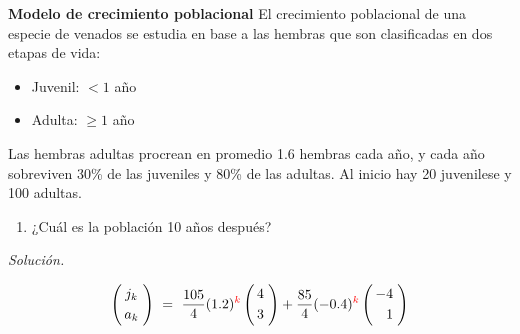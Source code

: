 \begin{frame} 
	
	\begin{ejer}{\textbf{Modelo de crecimiento poblacional}} \justifying
		El crecimiento poblacional de una especie de venados se estudia en base a las hembras que son clasificadas en dos etapas de vida:
		
		\vspace{-2mm}
		\begin{multicols}{2}
			\begin{itemize}
				\item Juvenil: $<1$ año
				\item Adulta: $\ge 1$ año
			\end{itemize}
		\end{multicols}
		
		\vspace{-2mm}
		Las hembras adultas procrean en promedio 1.6 hembras cada año, y cada año sobreviven 30\% de las juveniles y 80\% de las adultas. Al inicio hay 20 juvenilese y 100 adultas.
		\begin{enumerate}[$b$]
			\item ¿Cuál es la población 10 años después?
		\end{enumerate}
	\end{ejer}
	
	\textit{Solución.}
	
	\vspace{0mm}
	
	\begin{prop}{}
	\[	
	\left(
	\begin{array}{@{\hspace{0.3\tabcolsep}}c@{\hspace{0.5\tabcolsep}}}
	j_k   \\[1mm]
	a_k 
	\end{array}
	\right) 
	\ = \
	\frac{105}{4} (1.2)^{\color{red}k}
	\left(
	\begin{array}{@{\hspace{0.3\tabcolsep}}c@{\hspace{0.5\tabcolsep}}}
	4   \\[1mm]
	3 
	\end{array}
	\right) 
	+
	\frac{85}{4} (-0.4)^{\color{red}k}
	\left(
	\begin{array}{@{\hspace{0.3\tabcolsep}}r@{\hspace{0.5\tabcolsep}}}
	-4   \\[1mm]
	1 
	\end{array}
	\right) 
	\]
	\end{prop}


\end{frame}
